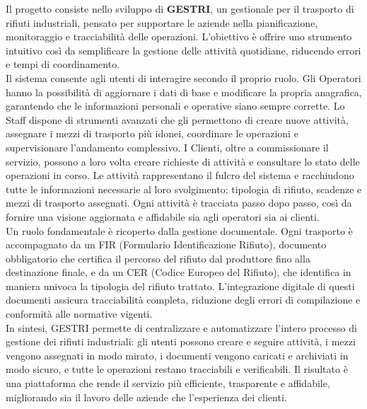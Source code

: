 \documentclass[a4paper]{report}
\begin{document}
\tableofcontents
\thispagestyle{empty}

\setcounter{page}{0}

Il progetto consiste nello sviluppo di \textbf{GESTRI}, un gestionale per il trasporto di rifiuti industriali, pensato per supportare le aziende nella pianificazione, monitoraggio e tracciabilità delle operazioni.
L’obiettivo è offrire uno strumento intuitivo così da semplificare la gestione delle attività quotidiane, riducendo errori e tempi di coordinamento.
\\
Il sistema consente agli utenti di interagire secondo il proprio ruolo.
Gli Operatori hanno la possibilità di aggiornare i dati di base e modificare la propria anagrafica, garantendo che le informazioni personali e operative siano sempre corrette. 
Lo Staff dispone di strumenti avanzati che gli permettono di creare nuove attività, assegnare i mezzi di trasporto più idonei, coordinare le operazioni e supervisionare l’andamento complessivo. 
I Clienti, oltre a commissionare il servizio, possono a loro volta creare richieste di attività e consultare lo stato delle operazioni in corso.
Le attività rappresentano il fulcro del sistema e racchiudono tutte le informazioni necessarie al loro svolgimento: tipologia di rifiuto, scadenze e mezzi di trasporto assegnati.
Ogni attività è tracciata passo dopo passo, così da fornire una visione aggiornata e affidabile sia agli operatori sia ai clienti.
\\
Un ruolo fondamentale è ricoperto dalla gestione documentale. 
Ogni trasporto è accompagnato da un FIR (Formulario Identificazione Rifiuto), documento obbligatorio che certifica il percorso del rifiuto dal produttore fino alla destinazione finale, e da un CER (Codice Europeo del Rifiuto), che identifica in maniera univoca la tipologia del rifiuto trattato.
L’integrazione digitale di questi documenti assicura tracciabilità completa, riduzione degli errori di compilazione e conformità alle normative vigenti.
\\
In sintesi, GESTRI permette di centralizzare e automatizzare l’intero processo di gestione dei rifiuti industriali: gli utenti possono creare e seguire attività, i mezzi vengono assegnati in modo mirato, i documenti vengono caricati e archiviati in modo sicuro, e tutte le operazioni restano tracciabili e verificabili.
Il risultato è una piattaforma che rende il servizio più efficiente, trasparente e affidabile, migliorando sia il lavoro delle aziende che l’esperienza dei clienti.
\end{document}

